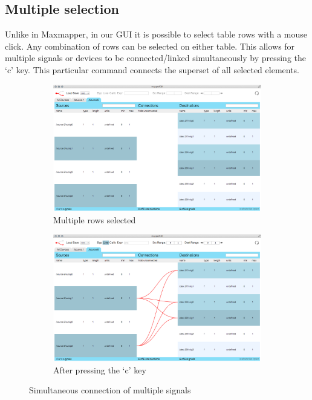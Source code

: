 	\subsection{Multiple selection} %
	\label{sub:multiple_selection}

Unlike in Maxmapper, in our GUI it is possible to select table rows with a mouse click. Any combination of rows can be selected on either table. This allows for multiple signals or devices to be connected/linked simultaneously by pressing the `c' key. This particular command connects the superset of all selected elements. 

\begin{figure}
	\centering
	\begin{subfigure}[]{0.49\textwidth}
		\centering
		\includegraphics[width=\textwidth]{figures/multi-select_before_connect}
		\caption{Multiple rows selected}
		\label{fig:multiple_connect_before}
	\end{subfigure}
	\begin{subfigure}[]{0.49\textwidth}
		\centering
		\includegraphics[width=\textwidth]{figures/multi-select_after_connect}
		\caption{After pressing the `c' key}
		\label{fig:multiple_connect_after}
	\end{subfigure}
	\caption{Simultaneous connection of multiple signals}\label{fig:multiple_connect}
\end{figure}

